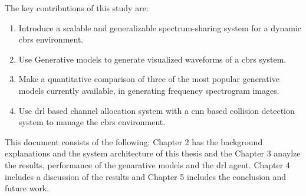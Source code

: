 The key contributions of this study are:
\begin{enumerate}
    \item Introduce a scalable and generalizable spectrum-sharing system for a dynamic \gls{cbrs} environment.
    \item Use Generative models to generate visualized waveforms of a \gls{cbrs} system.
    \item Make a quantitative comparison of three of the most popular generative models currently available, in generating frequency spectrogram images.
    \item Use \gls{drl} based channel allocation system with a \gls{cnn} based collision detection system to manage the \gls{cbrs} environment.
\end{enumerate}


This document consists of the following: Chapter 2 has the background explanations and the system architecture of this thesis and the Chapter 3 anaylze the results, performance of the genarative models and the \gls{drl} agent. Chapter 4 includes a discussion of the results and Chapter 5 includes the conclusion and future work.

